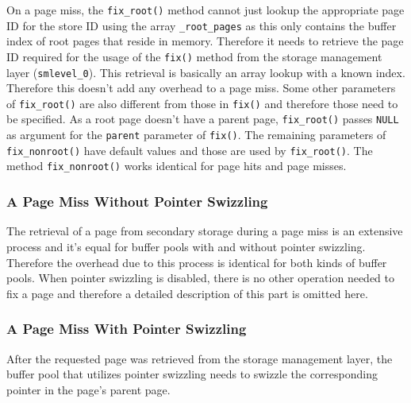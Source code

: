 	On a page miss, the \lstinline{fix_root()} method cannot just lookup the appropriate page ID for the store ID using the array \lstinline{_root_pages} as this only contains the buffer index of root pages that reside in memory. Therefore it needs to retrieve the page ID required for the usage of the \lstinline{fix()} method from the storage management layer (\lstinline{smlevel_0}). This retrieval is basically an array lookup with a known index. Therefore this doesn't add any overhead to a page miss. Some other parameters of \lstinline{fix_root()} are also different from those in \lstinline{fix()} and therefore those need to be specified. As a root page doesn't have a parent page, \lstinline{fix_root()} passes \lstinline{NULL} as argument for the \lstinline{parent} parameter of \lstinline{fix()}. The remaining parameters of \lstinline{fix_nonroot()} have default values and those are used by \lstinline{fix_root()}.
 The method \lstinline{fix_nonroot()} works identical for page hits and page misses.

\subsubsection{A Page Miss Without Pointer Swizzling} \label{subsubsec:pagemisswithout}

	The retrieval of a page from secondary storage during a page miss is an extensive process and it's equal for buffer pools with and without pointer swizzling. Therefore the overhead due to this process is identical for both kinds of buffer pools. When pointer swizzling is disabled, there is no other operation needed to fix a page and therefore a detailed description of this part is omitted here.

\subsubsection{A Page Miss With Pointer Swizzling} \label{subsubsec:pagemisswith}

	After the requested page was retrieved from the storage management layer, the buffer pool that utilizes pointer swizzling needs to swizzle the corresponding pointer in the page's parent page.

\begin{@empty}
	\lstset{
		language = [ISO]C++,
		style = basic
	}
	\begin{code}[ht!]
		\caption{Implementation of the swizzling of a pointer in \lstinline{bf_tree_m::fix()} in case of a page miss} \label{lst:fixswizzlemiss}
		
	\end{code}
\end{@empty}	
	
